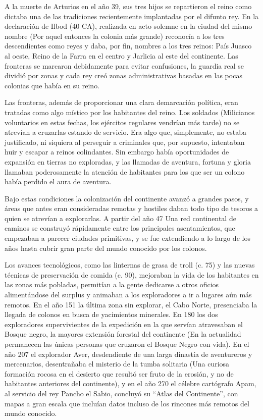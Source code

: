 A la muerte de Arturios en el año 39, sus tres hijos se repartieron el reino como dictaba una de las tradiciones recientemente implantadas por el difunto rey. En la declaración de Ilbod (40 CA), realizada en acto solemne en la ciudad del mismo nombre (Por aquel entonces la colonia más grande) reconocía a los tres descendientes como reyes y daba, por fin, nombres a los tres reinos: País Juasco al oeste, Reino de la Farra en el centro y Jarlicia al este del continente. Las fronteras se marcaron debidamente para evitar confusiones, la guardia real se dividió por zonas y cada rey creó zonas administrativas basadas en las pocas colonias que había en su reino. 
\par 
Las fronteras, además de proporcionar una clara demarcación política, eran tratadas como algo místico por los habitantes del reino. Los soldados (Milicianos voluntarios en estas fechas, los ejércitos regulares vendrían más tarde) no se atrevían a cruzarlas estando de servicio. Era algo que, simplemente, no estaba justificado, ni siquiera al perseguir a criminales que, por supuesto, intentaban huir y escapar a reinos colindantes. Sin embargo había oportunidades de expansión en tierras no exploradas, y las llamadas de aventura, fortuna y gloria llamaban poderosamente la atención de habitantes para los que ser un colono había perdido el aura de aventura.
\par 
Bajo estas condiciones la colonización del continente avanzó a grandes pasos, y áreas que antes eran consideradas remotas y hostiles daban todo tipo de tesoros a quien se atrevían a explorarlas. A partir del año 47 Una red continental de caminos se construyó rápidamente entre los principales asentamientos, que empezaban a parecer ciudades primitivas, y se fue extendiendo a lo largo de los años hasta cubrir gran parte del mundo conocido por los colonos. 
\par 
Los avances tecnológicos, como las linternas de grasa de troll (c. 75) y las nuevas técnicas de preservación de comida (c. 90), mejoraban la vida de los habitantes en las zonas más pobladas, permitían a la gente dedicarse a otros oficios alimentándose del surplus y animaban a los exploradores a ir a lugares aún más remotos. En el año 151 la última zona sin explorar, el Cabo Norte, presenciaba la llegada de colonos en busca de yacimientos minerales. En 180 los dos exploradores supervivientes de la expedición en la que servían atravesaban el Bosque negro, la mayores extensión forestal del continente (En la actualidad permanecen las únicas personas que cruzaron el Bosque Negro con vida). En el año 207 el explorador Aver, desdendiente de una larga dinastía de aventureros y mercenarios, desentrañaba el misterio de la tumba solitaria (Una curiosa formación rocosa en el desierto que resultó ser fruto de la erosión, y no de habitantes anteriores del continente), y en el año 270 el célebre cartógrafo Apam, al servicio del rey Pancho el Sabio, concluyó su ``Atlas del Continente'', con mapas a gran escala que incluían datos incluso de los rincones más remotos del mundo conocido.
